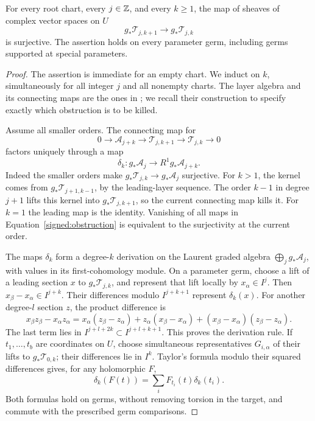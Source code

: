 \begin{proposition}\label{signed:all-orders}
For every root chart, every \(j\in\mathbb Z\), and every \(k\geq1\),
the map of sheaves of complex vector spaces on \(U\)
\begin{equation}\label{signed:all-order-surjection}
 g_*\mathcal T_{j,k+1}\longrightarrow g_*\mathcal T_{j,k}
\end{equation}
is surjective.  The assertion holds on every parameter germ,
including germs supported at special parameters.
\end{proposition}

\begin{proof}
The assertion is immediate for an empty chart.  We induct on \(k\),
simultaneously for all integer \(j\) and all nonempty charts.  The layer
algebra and its connecting maps are the
ones in \cite[Lemma~12.1]{BL}; we recall their construction to
specify exactly which obstruction is to be killed.

Assume all smaller orders.  The connecting map for
\[
 0\longrightarrow\mathcal A_{j+k}
 \longrightarrow\mathcal T_{j,k+1}
 \longrightarrow\mathcal T_{j,k}\longrightarrow0
\]
factors uniquely through a map
\begin{equation}\label{signed:obstruction}
 \delta_k:g_*\mathcal A_j\longrightarrow R^1g_*\mathcal A_{j+k}.
\end{equation}
Indeed the smaller orders make
\(g_*\mathcal T_{j,k}\to g_*\mathcal A_j\) surjective.  For
\(k>1\), the kernel comes from \(g_*\mathcal T_{j+1,k-1}\),
by the leading-layer sequence.  The order \(k-1\) in degree
\(j+1\) lifts this kernel into \(g_*\mathcal T_{j,k+1}\), so
the current connecting map kills it.  For \(k=1\) the leading
map is the identity.  Vanishing of all maps in
Equation~\eqref{signed:obstruction} is equivalent to the
surjectivity at the current order.

The maps \(\delta_k\) form a degree-\(k\) derivation on the
Laurent graded algebra \(\bigoplus_jg_*\mathcal A_j\), with
values in its first-cohomology module.  On a parameter germ, choose a lift
of a leading section \(x\) to \(g_*\mathcal T_{j,k}\), and represent that
lift locally by \(x_\alpha\in I^j\).  Then
\(x_\beta-x_\alpha\in I^{j+k}\).
Their differences modulo \(I^{j+k+1}\) represent
\(\delta_k(x)\).  For another degree-\(l\) section \(z\),
the product difference is
\[
 x_\beta z_\beta-x_\alpha z_\alpha
 =x_\alpha(z_\beta-z_\alpha)+z_\alpha(x_\beta-x_\alpha)
 +(x_\beta-x_\alpha)(z_\beta-z_\alpha).
\]
The last term lies in \(I^{j+l+2k}\subset I^{j+l+k+1}\).
This proves the derivation rule.  If \(t_1,\ldots,t_b\) are
coordinates on \(U\), choose simultaneous representatives
\(G_{i,\alpha}\) of their lifts to \(g_*\mathcal T_{0,k}\); their
differences lie in \(I^k\).  Taylor's
formula modulo their squared differences gives, for any
holomorphic \(F\),
\begin{equation}\label{signed:chain-rule}
 \delta_k(F(t))=\sum_i F_{t_i}(t)\delta_k(t_i).
\end{equation}
Both formulas hold on germs, without removing torsion in the
target, and commute with the prescribed germ comparisons.


\end{proof}
